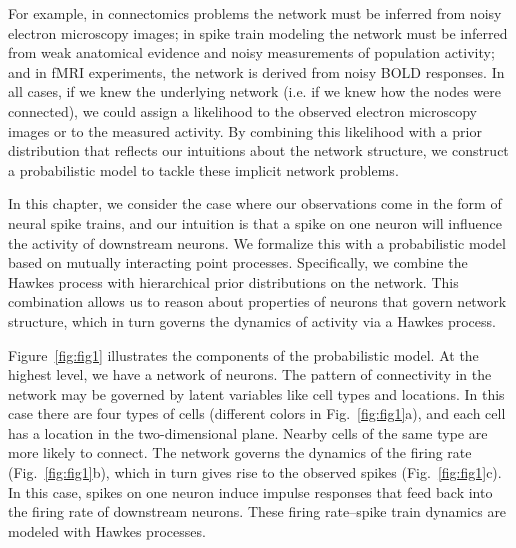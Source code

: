 For example, in connectomics problems the network must be inferred
from noisy electron microscopy images; in spike train modeling the
network must be inferred from weak anatomical evidence and noisy
measurements of population activity; and in fMRI experiments, the
network is derived from noisy BOLD responses.  In all cases, if we
knew the underlying network (i.e.  if we knew how the nodes were
connected), we could assign a likelihood to the observed electron
microscopy images or to the measured activity. By combining this
likelihood with a prior distribution that reflects our intuitions
about the network structure, we construct a probabilistic model to
tackle these implicit network problems.


In this chapter, we consider the case where our observations come in
the form of neural spike trains, and our intuition is that a spike on
one neuron will influence the activity of downstream neurons.  We formalize
this with a probabilistic model based on mutually interacting point
processes.  Specifically, we combine the Hawkes process
\citep{Hawkes-1971} with hierarchical prior distributions on the network.  This
combination allows us to reason about properties of neurons that govern
network structure, which in turn governs the dynamics of activity via
a Hawkes process. 

Figure~\ref{fig:fig1} illustrates the components of the
probabilistic model. At the highest level, we have a network of
neurons.  The pattern of connectivity in the network may be governed
by latent variables like cell types and locations. In this case there
are four types of cells (different colors in
Fig.~\ref{fig:fig1}a), and each cell has a location in the
two-dimensional plane. Nearby cells of the same type are more likely
to connect. The network governs the dynamics of the firing rate
(Fig.~\ref{fig:fig1}b), which in turn gives rise to the
observed spikes (Fig.~\ref{fig:fig1}c). In this case, spikes on
one neuron induce impulse responses that feed back into the firing
rate of downstream neurons. These firing rate--spike train dynamics are 
modeled with Hawkes processes. 

